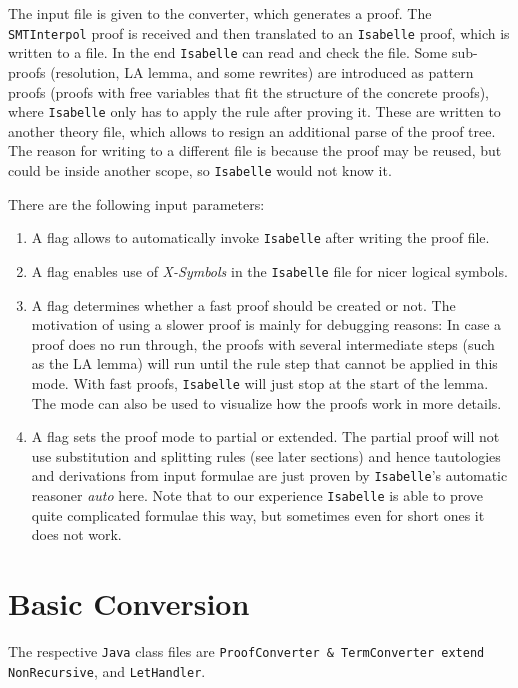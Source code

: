 \documentclass[10pt,a4paper]{article}
\newcommand{\si}{\texttt{SMTInterpol}\xspace}
\newcommand{\isa}{\texttt{Isabelle}\xspace}
\newcommand{\jav}{\texttt{Java}\xspace}
\newcommand{\ttt}{\texttt}
\begin{document}
\smallskip

The input file is given to the converter, which generates a proof. The \si proof is received and then translated to an \isa proof, which is written to a file. In the end \isa can read and check the file. Some sub-proofs (resolution, LA lemma, and some rewrites) are introduced as pattern proofs (proofs with free variables that fit the structure of the concrete proofs), where \isa only has to apply the rule after proving it. These are written to another theory file, which allows to resign an additional parse of the proof tree. The reason for writing to a different file is because the proof may be reused, but could be inside another scope, so \isa would not know it.

\smallskip

There are the following input parameters:
%
\begin{enumerate}
	\item A flag allows to automatically invoke \isa after writing the proof file.
	\item A flag enables use of \emph{X-Symbols} in the \isa file for nicer logical symbols.
	\item A flag determines whether a fast proof should be created or not. The motivation of using a slower proof is mainly for debugging reasons: In case a proof does no run through, the proofs with several intermediate steps (such as the LA lemma) will run until the rule step that cannot be applied in this mode. With fast proofs, \isa will just stop at the start of the lemma. The mode can also be used to visualize how the proofs work in more details.
	\item A flag sets the proof mode to partial or extended. The partial proof will not use substitution and splitting rules (see later sections) and hence tautologies and derivations from input formulae are just proven by \isa's automatic reasoner \emph{auto} here. Note that to our experience \isa is able to prove quite complicated formulae this way, but sometimes even for short ones it does not work.
\end{enumerate}
%
\section{Basic Conversion}\label{sec:bascon}
%
The respective \jav class files are \ttt{ProofConverter \& TermConverter extend NonRecursive}, and \ttt{LetHandler}.
%
\end{document}
